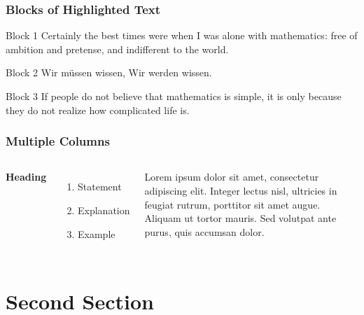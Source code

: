\documentclass{beamer}
\begin{document}
	
	\begin{frame}
		\frametitle{Blocks of Highlighted Text}
		\begin{block}{Block 1}
			Certainly the best times were when I was alone with mathematics: free of ambition and pretense, and indifferent to the world.
		\end{block}
		
		\begin{block}{Block 2}
			Wir müssen wissen, Wir werden wissen.
		\end{block}
		
		\begin{block}{Block 3}
			If people do not believe that mathematics is simple, it is only because they do not realize how complicated life is.	
		\end{block}
	\end{frame}
	
	
	\begin{frame}
		\frametitle{Multiple Columns}
		\begin{columns}[c] %
			
			\textbf{Heading}
			\begin{enumerate}
				\item Statement
				\item Explanation
				\item Example
			\end{enumerate}
			
			Lorem ipsum dolor sit amet, consectetur adipiscing elit. Integer lectus nisl, ultricies in feugiat rutrum, porttitor sit amet augue. Aliquam ut tortor mauris. Sed volutpat ante purus, quis accumsan dolor.
			
		\end{columns}
	\end{frame}
	
	\section{Second Section}
	
\end{document}
